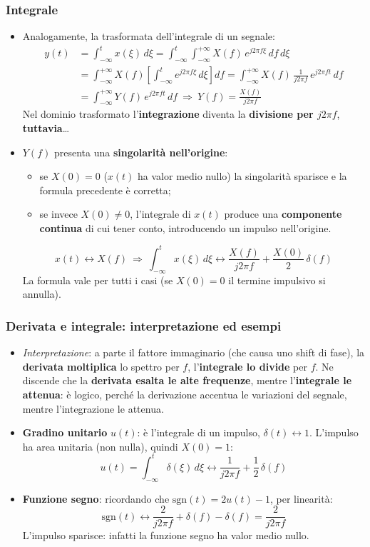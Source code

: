 \documentclass[12pt, a4paper]{article}
\begin{document}
\subsubsection{Integrale}
\begin{itemize}
    \item Analogamente, la trasformata dell'integrale di un segnale:
    \begin{align*}
        y(t)&=\int_{-\infty}^{t}x(\xi)\,d\xi=\int_{-\infty}^{t}\int_{-\infty}^{+\infty}X(f)\,e^{j2\pi f\xi}\,df\,d\xi\\
        &=\int_{-\infty}^{+\infty}X(f)\left[\int_{-\infty}^{t}e^{j2\pi f\xi}\,d\xi\right]df=\int_{-\infty}^{+\infty}X(f)\,\frac{1}{j2\pi f}\,e^{j2\pi ft}\,df\\
        &=\int_{-\infty}^{+\infty}Y(f)\,e^{j2\pi ft}\,df\ \Longrightarrow\ Y(f)=\frac{X(f)}{j2\pi f}
    \end{align*}
    Nel dominio trasformato l'\textbf{integrazione} diventa la \textbf{divisione per $j2\pi f$}, \textbf{tuttavia}\dots
    \item $Y(f)$ presenta una \textbf{singolarità nell'origine}:
    \begin{itemize}
        \item se $X(0)=0$ ($x(t)$ ha valor medio nullo) la singolarità sparisce e la formula precedente è corretta;
        \item se invece $X(0)\neq0$, l'integrale di $x(t)$ produce una \textbf{componente continua} di cui tener conto, introducendo un impulso nell'origine.
    \end{itemize}
    $$x(t)\longleftrightarrow X(f)\ \Longrightarrow\ \int_{-\infty}^{t}x(\xi)\,d\xi\longleftrightarrow\frac{X(f)}{j2\pi f}+\frac{X(0)}{2}\,\delta(f)$$
    La formula vale per tutti i casi (se $X(0)=0$ il termine impulsivo si annulla).
\end{itemize}

\subsubsection{Derivata e integrale: interpretazione ed esempi}
\begin{itemize}
    \item \textit{Interpretazione}: a parte il fattore immaginario (che causa uno shift di fase), la \textbf{derivata moltiplica} lo spettro per $f$, l'\textbf{integrale lo divide} per $f$. Ne discende che la \textbf{derivata esalta le alte frequenze}, mentre l'\textbf{integrale le attenua}: è logico, perché la derivazione accentua le variazioni del segnale, mentre l'integrazione le attenua.
    \item \textbf{Gradino unitario} $u(t)$: è l'integrale di un impulso, $\delta(t)\longleftrightarrow1$. L'impulso ha area unitaria (non nulla), quindi $X(0)=1$:
    $$u(t)=\int_{-\infty}^{t}\delta(\xi)\,d\xi\longleftrightarrow\frac{1}{j2\pi f}+\frac12\,\delta(f)$$
    \item \textbf{Funzione segno}: ricordando che $\text{sgn}(t)=2u(t)-1$, per linearità:
    $$\text{sgn}(t)\longleftrightarrow\frac{2}{j2\pi f}+\delta(f)-\delta(f)=\frac{2}{j2\pi f}$$
    L'impulso sparisce: infatti la funzione segno ha valor medio nullo.
\end{itemize}
\end{document}
